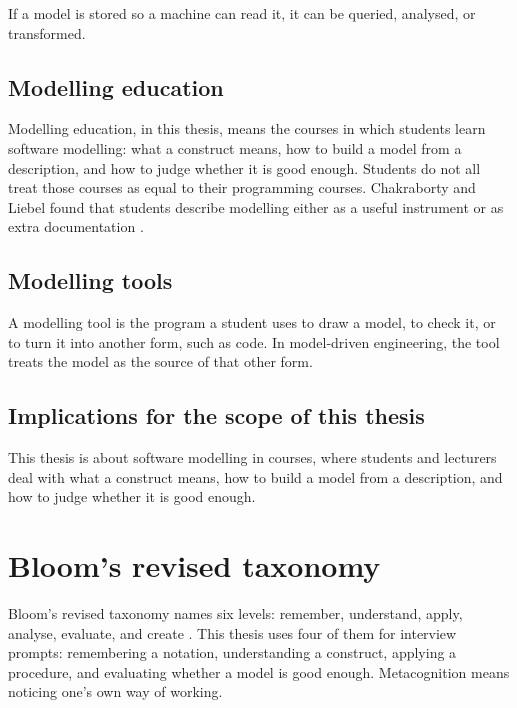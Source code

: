 If a model is stored so a machine can read it, it can be queried, analysed, or transformed.

\subsection{Modelling education}
\label{sec:modelling_education}

Modelling education, in this thesis, means the courses in which students learn software modelling: what a construct means, how to build a model from a description, and how to judge whether it is good enough. Students do not all treat those courses as equal to their programming courses. Chakraborty and Liebel found that students describe modelling either as a useful instrument or as extra documentation \cite{chakraborty2022perceptions}.

\subsection{Modelling tools}
\label{subsec:tools_mde_education}

A modelling tool is the program a student uses to draw a model, to check it, or to turn it into another form, such as code. In model-driven engineering, the tool treats the model as the source of that other form.

\subsection{Implications for the scope of this thesis}
\label{subsec:implications_scope_thesis}

This thesis is about software modelling in courses, where students and lecturers deal with what a construct means, how to build a model from a description, and how to judge whether it is good enough.

\section{Bloom's revised taxonomy}
\label{sec:blooms_taxonomy}

Bloom's revised taxonomy names six levels: remember, understand, apply, analyse, evaluate, and create \cite{krathwohl2002revision}. This thesis uses four of them for interview prompts: remembering a notation, understanding a construct, applying a procedure, and evaluating whether a model is good enough. Metacognition means noticing one's own way of working.

